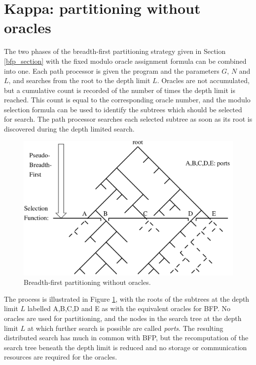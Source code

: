\documentclass[a4paper,11pt,twoside]{article}
\begin{document}
\section{Kappa: partitioning without oracles} %
\label{kappa_section}

The two phases of the breadth-first partitioning strategy given
in Section \ref{bfp_section} with the fixed modulo oracle assignment
formula can be combined into one.  Each path processor is given the
program and the parameters $G$, $N$ and $L$, and searches from the
root to the depth limit $L$.  Oracles are not accumulated, but
a cumulative count is recorded of the number of times the depth limit
is reached.  This count is equal to the corresponding oracle number,
and the modulo selection formula can be used to identify the
subtrees which should be selected for search.  The path processor
searches each selected subtree as soon as its root is discovered
during the depth limited search.

\begin{figure}
  \includegraphics[width=\linewidth]{port_tree.png}
  \caption{Breadth-first partitioning without oracles.}
  \label{port_tree}
\end{figure}

The process is illustrated in Figure \ref{port_tree}, with the roots of the
subtrees at the depth limit $L$ labelled A,B,C,D and E as with the equivalent
oracles for BFP.  No oracles are used for partitioning, and the nodes in the
search tree at the depth limit $L$ at which further search is possible are
called \textit{ports}.  The resulting distributed search has much in common
with BFP, but the recomputation of the search tree beneath the depth limit is
reduced and no storage or communication resources are required for the oracles.
\end{document}
